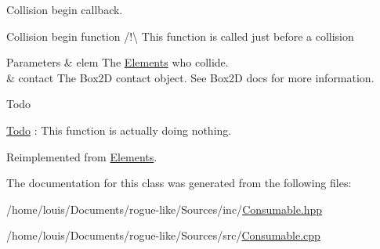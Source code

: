 Collision begin callback. 

Collision begin function /!\textbackslash{} This function is called just before a collision 
\begin{DoxyParams}{Parameters}
{\em } & elem The \hyperlink{class_elements}{Elements} who collide. \\
\hline
{\em } & contact The Box2\-D contact object. See Box2\-D docs for more information. \\
\hline
\end{DoxyParams}
\begin{DoxyRefDesc}{Todo}
\item[\hyperlink{todo__todo000003}{Todo}]\-: This function is actually doing nothing. \end{DoxyRefDesc}


Reimplemented from \hyperlink{class_elements_a108938e08197adc349e98fb91abe1b5a}{Elements}.



The documentation for this class was generated from the following files\-:\begin{DoxyCompactItemize}
\item 
/home/louis/\-Documents/rogue-\/like/\-Sources/inc/\hyperlink{_consumable_8hpp}{Consumable.\-hpp}\item 
/home/louis/\-Documents/rogue-\/like/\-Sources/src/\hyperlink{_consumable_8cpp}{Consumable.\-cpp}\end{DoxyCompactItemize}
